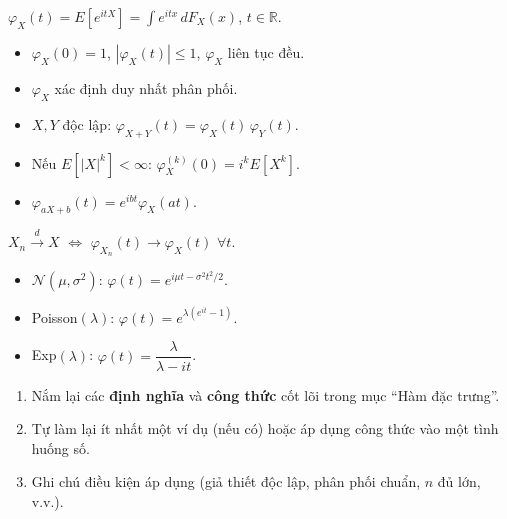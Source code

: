 \documentclass[12pt,a4paper]{article}
\begin{document}
\begin{dinhnghia}
  $\varphi_X(t) = E[e^{itX}] = \displaystyle\int e^{itx}\,dF_X(x)$, $t \in \mathbb{R}$.
\end{dinhnghia}

\begin{tinhchat}
  \begin{itemize}
    \item $\varphi_X(0) = 1$, $|\varphi_X(t)| \le 1$, $\varphi_X$ liên tục đều.
    \item $\varphi_X$ xác định duy nhất phân phối.
    \item $X, Y$ độc lập: $\varphi_{X+Y}(t) = \varphi_X(t)\,\varphi_Y(t)$.
    \item Nếu $E[|X|^k] < \infty$: $\varphi_X^{(k)}(0) = i^k E[X^k]$.
    \item $\varphi_{aX+b}(t) = e^{ibt}\varphi_X(at)$.
  \end{itemize}
\end{tinhchat}

\begin{dinhly}[title={Định lý liên tục Lévy}]
  $X_n \xrightarrow{d} X$ $\Leftrightarrow$ $\varphi_{X_n}(t) \to \varphi_X(t)$ $\forall t$.
\end{dinhly}

\begin{vidu}
  \begin{itemize}
    \item $\mathcal{N}(\mu, \sigma^2)$: $\varphi(t) = e^{i\mu t - \sigma^2 t^2/2}$.
    \item Poisson$(\lambda)$: $\varphi(t) = e^{\lambda(e^{it}-1)}$.
    \item Exp$(\lambda)$: $\varphi(t) = \dfrac{\lambda}{\lambda - it}$.
  \end{itemize}
\end{vidu}


\begin{tongket}[title={Tổng kết: Hàm đặc trưng}]
\begin{enumerate}
  \item Nắm lại các \textbf{định nghĩa} và \textbf{công thức} cốt lõi trong mục ``Hàm đặc trưng''.
  \item Tự làm lại ít nhất một ví dụ (nếu có) hoặc áp dụng công thức vào một tình huống số.
  \item Ghi chú điều kiện áp dụng (giả thiết độc lập, phân phối chuẩn, $n$ đủ lớn, v.v.).
\end{enumerate}
\end{tongket}
\end{document}
